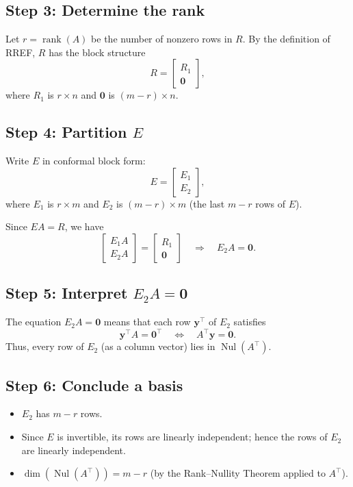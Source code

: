 \documentclass{article}
\begin{document}
\subsection*{Step 3: Determine the rank}
Let $r = \operatorname{rank}(A)$ be the number of nonzero rows in $R$. By the definition of RREF, $R$ has the block structure
\[
R = \begin{bmatrix} R_1 \\ \mathbf{0} \end{bmatrix},
\]
where $R_1$ is $r \times n$ and $\mathbf{0}$ is $(m - r) \times n$.

\subsection*{Step 4: Partition $E$}
Write $E$ in conformal block form:
\[
E = \begin{bmatrix} E_1 \\ E_2 \end{bmatrix},
\]
where $E_1$ is $r \times m$ and $E_2$ is $(m - r) \times m$ (the last $m - r$ rows of $E$).

Since $EA = R$, we have
\[
\begin{bmatrix} E_1 A \\ E_2 A \end{bmatrix} = \begin{bmatrix} R_1 \\ \mathbf{0} \end{bmatrix}
\quad \Longrightarrow \quad
E_2 A = \mathbf{0}.
\]

\subsection*{Step 5: Interpret $E_2 A = \mathbf{0}$}
The equation $E_2 A = \mathbf{0}$ means that each row $\mathbf{y}^\top$ of $E_2$ satisfies
\[
\mathbf{y}^\top A = \mathbf{0}^\top
\quad \Longleftrightarrow \quad
A^\top \mathbf{y} = \mathbf{0}.
\]
Thus, every row of $E_2$ (as a column vector) lies in $\operatorname{Nul}(A^\top)$.

\subsection*{Step 6: Conclude a basis}
\begin{itemize}
\item $E_2$ has $m - r$ rows.
    \item Since $E$ is invertible, its rows are linearly independent; hence the rows of $E_2$ are linearly independent.
    \item $\dim(\operatorname{Nul}(A^\top)) = m - r$ (by the Rank--Nullity Theorem applied to $A^\top$).
\end{itemize}
\end{document}
